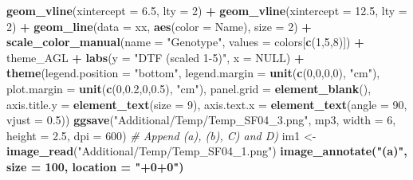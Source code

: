 \documentclass[
]{article}
\newenvironment{Shaded}{\begin{snugshade}}{\end{snugshade}}
\newcommand{\CommentTok}[1]{\textcolor[rgb]{0.56,0.35,0.01}{\textit{#1}}}
\newcommand{\DataTypeTok}[1]{\textcolor[rgb]{0.13,0.29,0.53}{#1}}
\newcommand{\DecValTok}[1]{\textcolor[rgb]{0.00,0.00,0.81}{#1}}
\newcommand{\FloatTok}[1]{\textcolor[rgb]{0.00,0.00,0.81}{#1}}
\newcommand{\KeywordTok}[1]{\textcolor[rgb]{0.13,0.29,0.53}{\textbf{#1}}}
\newcommand{\NormalTok}[1]{#1}
\newcommand{\OperatorTok}[1]{\textcolor[rgb]{0.81,0.36,0.00}{\textbf{#1}}}
\newcommand{\OtherTok}[1]{\textcolor[rgb]{0.56,0.35,0.01}{#1}}
\newcommand{\StringTok}[1]{\textcolor[rgb]{0.31,0.60,0.02}{#1}}
\begin{document}
\begin{Shaded}
\begin{Highlighting}[]
{{{{{{{\StringTok{  }\KeywordTok{geom_vline}\NormalTok{(}\DataTypeTok{xintercept =} \FloatTok{6.5}\NormalTok{,  }\DataTypeTok{lty =} \DecValTok{2}\NormalTok{) }\OperatorTok{+}\StringTok{ }
\StringTok{  }\KeywordTok{geom_vline}\NormalTok{(}\DataTypeTok{xintercept =} \FloatTok{12.5}\NormalTok{, }\DataTypeTok{lty =} \DecValTok{2}\NormalTok{) }\OperatorTok{+}
\StringTok{  }\KeywordTok{geom_line}\NormalTok{(}\DataTypeTok{data =}\NormalTok{ xx, }\KeywordTok{aes}\NormalTok{(}\DataTypeTok{color =}\NormalTok{ Name), }\DataTypeTok{size =} \DecValTok{2}\NormalTok{) }\OperatorTok{+}\StringTok{ }
\StringTok{  }\KeywordTok{scale_color_manual}\NormalTok{(}\DataTypeTok{name =} \StringTok{"Genotype"}\NormalTok{, }\DataTypeTok{values =}\NormalTok{ colors[}\KeywordTok{c}\NormalTok{(}\DecValTok{1}\NormalTok{,}\DecValTok{5}\NormalTok{,}\DecValTok{8}\NormalTok{)]) }\OperatorTok{+}
\StringTok{  }\NormalTok{theme_AGL }\OperatorTok{+}\StringTok{ }\KeywordTok{labs}\NormalTok{(}\DataTypeTok{y =} \StringTok{"DTF (scaled 1-5)"}\NormalTok{, }\DataTypeTok{x =} \OtherTok{NULL}\NormalTok{) }\OperatorTok{+}
\StringTok{  }\KeywordTok{theme}\NormalTok{(}\DataTypeTok{legend.position =} \StringTok{"bottom"}\NormalTok{, }
        \DataTypeTok{legend.margin =} \KeywordTok{unit}\NormalTok{(}\KeywordTok{c}\NormalTok{(}\DecValTok{0}\NormalTok{,}\DecValTok{0}\NormalTok{,}\DecValTok{0}\NormalTok{,}\DecValTok{0}\NormalTok{), }\StringTok{"cm"}\NormalTok{),}
        \DataTypeTok{plot.margin   =} \KeywordTok{unit}\NormalTok{(}\KeywordTok{c}\NormalTok{(}\DecValTok{0}\NormalTok{,}\FloatTok{0.2}\NormalTok{,}\DecValTok{0}\NormalTok{,}\FloatTok{0.5}\NormalTok{), }\StringTok{"cm"}\NormalTok{),}
        \DataTypeTok{panel.grid   =} \KeywordTok{element_blank}\NormalTok{(),}
        \DataTypeTok{axis.title.y =} \KeywordTok{element_text}\NormalTok{(}\DataTypeTok{size =} \DecValTok{9}\NormalTok{),}
        \DataTypeTok{axis.text.x  =} \KeywordTok{element_text}\NormalTok{(}\DataTypeTok{angle =} \DecValTok{90}\NormalTok{, }\DataTypeTok{vjust =} \FloatTok{0.5}\NormalTok{))}
\KeywordTok{ggsave}\NormalTok{(}\StringTok{"Additional/Temp/Temp_SF04_3.png"}\NormalTok{, mp3, }\DataTypeTok{width =} \DecValTok{6}\NormalTok{, }\DataTypeTok{height =} \FloatTok{2.5}\NormalTok{, }\DataTypeTok{dpi =} \DecValTok{600}\NormalTok{)}
\CommentTok{# Append (a), (b), C) and D)}
\NormalTok{im1 <-}\StringTok{ }\KeywordTok{image_read}\NormalTok{(}\StringTok{"Additional/Temp/Temp_SF04_1.png"}\NormalTok{) }\OperatorTok{%
\StringTok{  }\KeywordTok{image_annotate}\NormalTok{(}\StringTok{"(a)"}\NormalTok{, }\DataTypeTok{size =} \DecValTok{100}\NormalTok{, }\DataTypeTok{location =} \StringTok{"+0+0"}\NormalTok{) }\OperatorTok{%
}}}}}}}}}
\end{Highlighting}
\end{Shaded}
\end{document}
